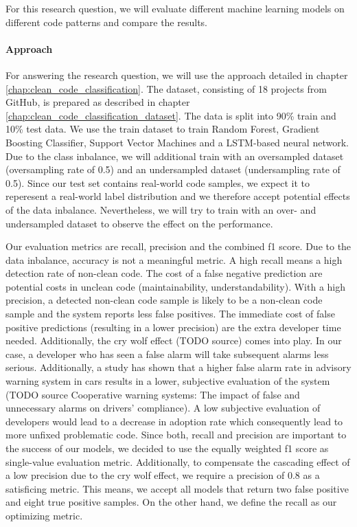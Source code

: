 For this research question, we will evaluate different machine learning models on different code patterns and compare the results.

\paragraph{Approach}
For answering the research question, we will use the approach detailed in chapter \ref{chap:clean_code_classification}.  The dataset, consisting of 18 projects from GitHub, is prepared as described in chapter \ref{chap:clean_code_classification_dataset}. The data is split into 90\% train and 10\% test data. We use the train dataset to train Random Forest, Gradient Boosting Classifier, Support Vector Machines and a LSTM-based neural network. Due to the class inbalance, we will additional train with an oversampled dataset (oversampling rate of 0.5) and an undersampled dataset (undersampling rate of 0.5). Since our test set contains real-world code samples, we expect it to reperesent a real-world label distribution and we therefore accept potential effects of the data inbalance. Nevertheless, we will try to train with an over- and undersampled dataset to observe the effect on the performance.

Our evaluation metrics are recall, precision and the combined f1 score. Due to the data inbalance, accuracy is not a meaningful metric. A high recall means a high detection rate of non-clean code. The cost of a false negative prediction are potential costs in unclean code (maintainability, understandability). With a high precision, a detected non-clean code sample is likely to be a non-clean code sample and the system reports less false positives. The immediate cost of false positive predictions (resulting in a lower precision) are the extra developer time needed. Additionally, the cry wolf effect (TODO source) comes into play. In our case, a developer who has seen a false alarm will take subsequent alarms less serious. Additionally, a study has shown that a higher false alarm rate in advisory warning system in cars results in a lower, subjective evaluation of the system (TODO source Cooperative warning systems: The impact of false and unnecessary alarms on drivers’ compliance). A low subjective evaluation of developers would lead to a decrease in adoption rate which consequently lead to more unfixed problematic code. Since both, recall and precision are important to the success of our models, we decided to use the equally weighted f1 score as single-value evaluation metric.
Additionally, to compensate the cascading effect of a low precision due to the cry wolf effect, we require a precision of 0.8 as a satisficing metric. This means, we accept all models that return two false positive and eight true positive samples. On the other hand, we define the recall as our optimizing metric.

